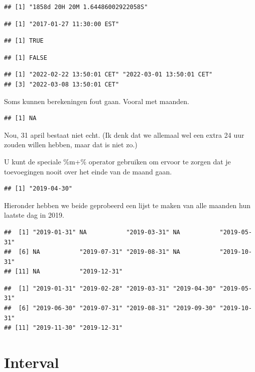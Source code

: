 \documentclass[]{tufte-book}
\begin{document}
\begin{verbatim}
## [1] "1858d 20H 20M 1.64486002922058S"
\end{verbatim}

\begin{verbatim}
## [1] "2017-01-27 11:30:00 EST"
\end{verbatim}

\begin{verbatim}
## [1] TRUE
\end{verbatim}

\begin{verbatim}
## [1] FALSE
\end{verbatim}

\begin{verbatim}
## [1] "2022-02-22 13:50:01 CET" "2022-03-01 13:50:01 CET"
## [3] "2022-03-08 13:50:01 CET"
\end{verbatim}

Soms kunnen berekeningen fout gaan. Vooral met maanden.

\begin{verbatim}
## [1] NA
\end{verbatim}

Nou, 31 april bestaat niet echt. (Ik denk dat we allemaal wel een extra 24 uur zouden willen hebben, maar dat is niet zo.)

U kunt de speciale \%m+\% operator gebruiken om ervoor te zorgen dat je toevoegingen nooit over het einde van de maand gaan.

\begin{verbatim}
## [1] "2019-04-30"
\end{verbatim}

Hieronder hebben we beide geprobeerd een lijst te maken van alle maanden hun laatste dag in 2019.

\begin{verbatim}
##  [1] "2019-01-31" NA           "2019-03-31" NA           "2019-05-31"
##  [6] NA           "2019-07-31" "2019-08-31" NA           "2019-10-31"
## [11] NA           "2019-12-31"
\end{verbatim}

\begin{verbatim}
##  [1] "2019-01-31" "2019-02-28" "2019-03-31" "2019-04-30" "2019-05-31"
##  [6] "2019-06-30" "2019-07-31" "2019-08-31" "2019-09-30" "2019-10-31"
## [11] "2019-11-30" "2019-12-31"
\end{verbatim}

\hypertarget{interval-2}{%
\section{Interval}\label{interval-2}}
\end{document}

